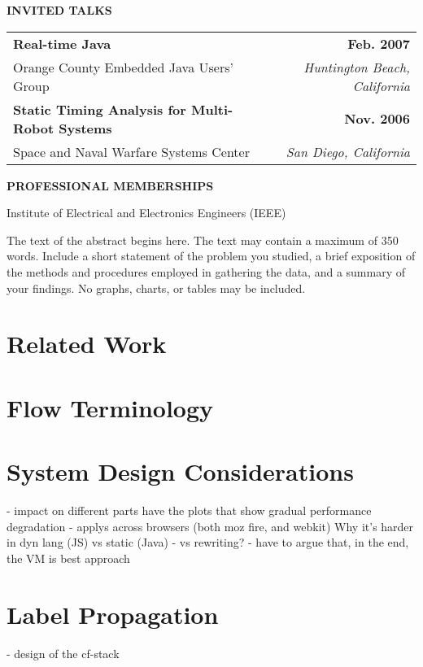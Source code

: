 \documentclass[12pt,fleqn]{ucithesis}
\begin{document}
{	\vspace{12pt}
	\textbf{INVITED TALKS}

	\begin{tabular*}{1\textwidth}{@{\extracolsep{\fill}}lr}
		\textbf{Real-time Java} & \textbf{Feb. 2007} \\
		\vspace{6pt}
		Orange County Embedded Java Users' Group & \emph{Huntington Beach, California} \\
		\textbf{Static Timing Analysis for Multi-Robot Systems} & \textbf{Nov. 2006} \\
		Space and Naval Warfare Systems Center & \emph{San Diego, California} \\
	\end{tabular*}

	\vspace{12pt}
	\textbf{PROFESSIONAL MEMBERSHIPS}

	Institute of Electrical and Electronics Engineers (IEEE)
}

\thesisabstract
{
	The text of the abstract begins here. The text may contain a maximum of 350 words. Include a short statement of the 
problem you studied, a brief exposition of the methods and procedures employed in gathering the data, and a summary of your 
findings. No graphs, charts, or tables may be included.
}

\preliminarypages



\chapter{Related Work}
\chapter{Flow Terminology}
\chapter{System Design Considerations}
  - impact on different parts
    have the plots that show gradual performance degradation
  - applys across browsers (both moz fire, and webkit)
Why it's harder in dyn lang (JS) vs static (Java)
 - vs rewriting?
 - have to argue that, in the end, the VM is best approach
\chapter{Label Propagation}
 - design of the cf-stack
\end{document}
